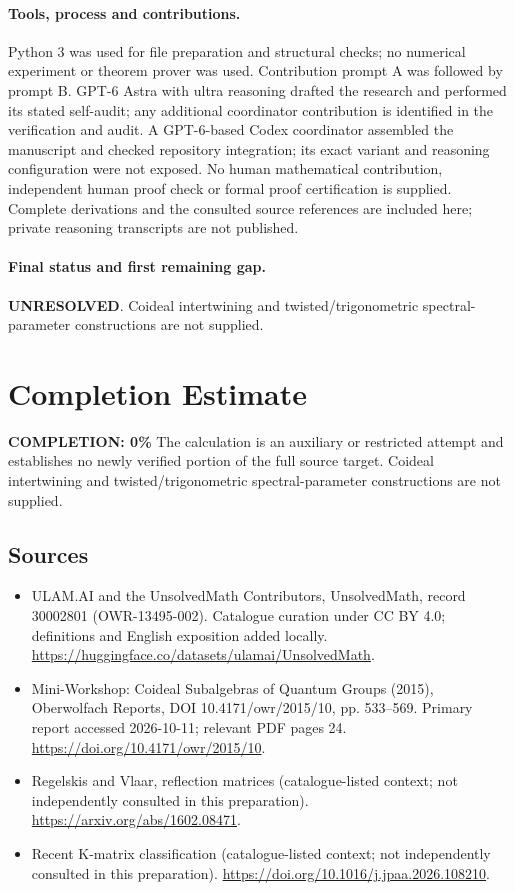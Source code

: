 \documentclass[11pt]{article}
\begin{document}
\paragraph{Tools, process and contributions.}
Python 3 was used for file preparation and structural checks; no numerical experiment or theorem prover was used. Contribution prompt A was followed by prompt B. GPT-6 Astra with ultra reasoning drafted the research and performed its stated self-audit; any additional coordinator contribution is identified in the verification and audit. A GPT-6-based Codex coordinator assembled the manuscript and checked repository integration; its exact variant and reasoning configuration were not exposed. No human mathematical contribution, independent human proof check or formal proof certification is supplied. Complete derivations and the consulted source references are included here; private reasoning transcripts are not published.

\paragraph{Final status and first remaining gap.}
\textbf{UNRESOLVED}. Coideal intertwining and twisted/trigonometric spectral-parameter constructions are not supplied.

\section{Completion Estimate}
\noindent\textbf{COMPLETION: 0\%}
The calculation is an auxiliary or restricted attempt and establishes no newly verified portion of the full source target. Coideal intertwining and twisted/trigonometric spectral-parameter constructions are not supplied.

\subsection{Sources}
\begin{itemize}
\item[\hypertarget{source:30002801:1}{S1}] ULAM.AI and the UnsolvedMath Contributors, UnsolvedMath, record 30002801 (OWR-13495-002). Catalogue curation under CC BY 4.0; definitions and English exposition added locally.
\url{https://huggingface.co/datasets/ulamai/UnsolvedMath}.
\item[\hypertarget{source:30002801:2}{S2}] Mini-Workshop: Coideal Subalgebras of Quantum Groups (2015), Oberwolfach Reports, DOI 10.4171/owr/2015/10, pp. 533--569. Primary report accessed 2026-10-11; relevant PDF pages 24.
\url{https://doi.org/10.4171/owr/2015/10}.
\item[\hypertarget{source:30002801:3}{S3}] Regelskis and Vlaar, reflection matrices (catalogue-listed context; not independently consulted in this preparation).
\url{https://arxiv.org/abs/1602.08471}.
\item[\hypertarget{source:30002801:4}{S4}] Recent K-matrix classification (catalogue-listed context; not independently consulted in this preparation).
\url{https://doi.org/10.1016/j.jpaa.2026.108210}.
\end{itemize}
\label{end:30002801}
\end{document}
